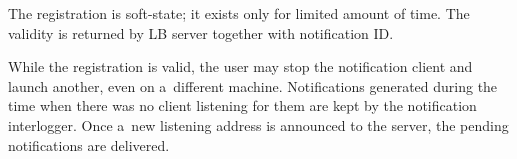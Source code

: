 The registration is soft-state; it exists only for limited amount of time. The
validity is returned by LB server together with notification ID.

While the registration is valid, 
the user may stop the notification client and launch another, even
on a~different machine.
Notifications generated during the time when there was no client listening
for them are kept by the notification interlogger.
Once a~new listening address is announced to the
server, the pending notifications are delivered. 

